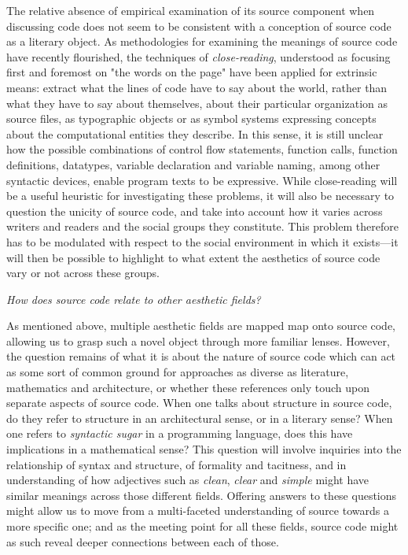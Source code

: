 The relative absence of empirical examination of its source component when discussing code does not seem to be consistent with a conception of source code as a literary object. As methodologies for examining the meanings of source code have recently flourished, the techniques of \emph{close-reading}, understood as focusing first and foremost on "the words on the page"\cite{richards_practical_1930} have been applied for extrinsic means: extract what the lines of code have to say about the world, rather than what they have to say about themselves, about their particular organization as source files, as typographic objects or as symbol systems expressing concepts about the computational entities they describe. In this sense, it is still unclear how the possible combinations of control flow statements, function calls, function definitions, datatypes, variable declaration and variable naming, among other syntactic devices, enable program texts to be expressive. While close-reading will be a useful heuristic for investigating these problems, it will also be necessary to question the unicity of source code, and take into account how it varies across writers and readers and the social groups they constitute. This problem therefore has to be modulated with respect to the social environment in which it exists—it will then be possible to highlight to what extent the aesthetics of source code vary or not across these groups.

\vspace*{1\baselineskip}

\emph{How does source code relate to other aesthetic fields?}

As mentioned above, multiple aesthetic fields are mapped map onto source code, allowing us to grasp such a novel object through more familiar lenses. However, the question remains of what it is about the nature of source code which can act as some sort of common ground for approaches as diverse as literature, mathematics and architecture, or whether these references only touch upon separate aspects of source code. When one talks about structure in source code, do they refer to structure in an architectural sense, or in a literary sense? When one refers to \emph{syntactic sugar} in a programming language, does this have implications in a mathematical sense? This question will involve inquiries into the relationship of syntax and structure, of formality and tacitness, and in understanding of how adjectives such as \emph{clean}, \emph{clear} and \emph{simple} might have similar meanings across those different fields. Offering answers to these questions might allow us to move from a multi-faceted understanding of source towards a more specific one; and as the meeting point for all these fields, source code might as such reveal deeper connections between each of those.

